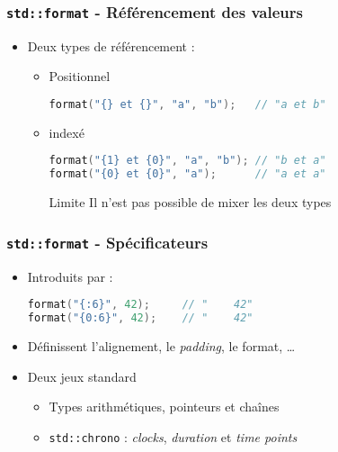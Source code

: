 \documentclass[C++.tex]{subfiles}
\begin{document}
\begin{frame}[fragile]
	\frametitle{\lstinline|std::format| - Référencement des valeurs}
	\begin{itemize}
		\item Deux types de référencement :
		\begin{itemize}
			\item Positionnel
	
			\begin{lstlisting}[language=C++]
format("{} et {}", "a", "b"); 	// "a et b"\end{lstlisting}
	
			\item indexé
	
			\begin{lstlisting}[language=C++]
format("{1} et {0}", "a", "b"); // "b et a"
format("{0} et {0}", "a");      // "a et a"\end{lstlisting}
	
	
			\begin{alertblock}{Limite}
				Il n'est pas possible de mixer les deux types
			\end{alertblock}
		\end{itemize}
	\end{itemize}
\end{frame}

\begin{frame}[fragile]
	\frametitle{\lstinline|std::format| - Spécificateurs}
	\begin{itemize}
		\item Introduits par \og : \fg{}

			\begin{lstlisting}[language=C++]
format("{:6}", 42);    	// "    42"
format("{0:6}", 42);    // "    42"\end{lstlisting}

		\item Définissent l'alignement, le \textit{padding}, le format, \ldots
		\item Deux jeux standard
		\begin{itemize}
			\item Types arithmétiques, pointeurs et chaînes
			\item \lstinline|std::chrono| : \textit{clocks}, \textit{duration} et \textit{time points}
		\end{itemize}
	\end{itemize}
\end{frame}
\end{document}
